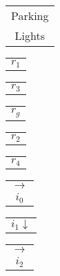 \documentclass{book}
\begin{document}
\stopmpxshipout
\mpxshipout%
{\small \renewcommand{\arraystretch}{.9}
                \circuitfont\begin{tabular}[t]{@{}c@{}}
                   Parking \\ Lights
	        \end{tabular}}%
\stopmpxshipout
\mpxshipout%
{\small \renewcommand{\arraystretch}{.9}
              \circuitfont\begin{tabular}[t]{@{}r@{}}
                  $r_1$    
              \end{tabular}}%
\stopmpxshipout
\mpxshipout%
{\small \renewcommand{\arraystretch}{.9}
              \circuitfont\begin{tabular}[t]{@{}l@{}}
                  $r_3$    
              \end{tabular}}%
\stopmpxshipout
\mpxshipout%
{\small \renewcommand{\arraystretch}{.9}
              \circuitfont\begin{tabular}[b]{@{}c@{}}
                  $r_g$    
              \end{tabular}}%
\stopmpxshipout
\mpxshipout%
{\small \renewcommand{\arraystretch}{.9}
              \circuitfont\begin{tabular}[t]{@{}r@{}}
                  $r_2$    
              \end{tabular}}%
\stopmpxshipout
\mpxshipout%
{\small \renewcommand{\arraystretch}{.9}
              \circuitfont\begin{tabular}[t]{@{}l@{}}
                  $r_4$
              \end{tabular}}%
\stopmpxshipout
\mpxshipout%
{\small \renewcommand{\arraystretch}{.9}
              \begin{tabular}[t]{@{}c@{}}
                  $\longrightarrow$ \\ $i_0$     
              \end{tabular}}%
\stopmpxshipout
\mpxshipout%
{\small \renewcommand{\arraystretch}{.9}
              \begin{tabular}[t]{@{}r@{}}
                  $i_1 \downarrow$    
              \end{tabular}}%
\stopmpxshipout
\mpxshipout%
{\small \renewcommand{\arraystretch}{.9}
              \begin{tabular}[t]{@{}c@{}}
                  $\longrightarrow$ \\ $i_2$     
              \end{tabular}}%
\end{document}
